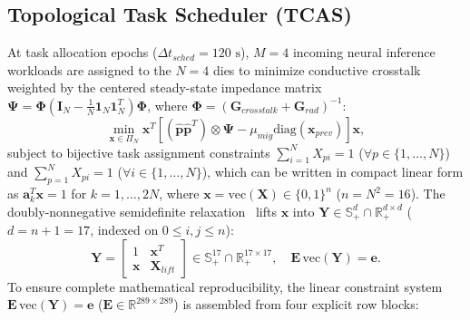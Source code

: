 \documentclass[a4paper,fleqn]{cas-dc}
\begin{document}
\subsection{Topological Task Scheduler (TCAS)}
At task allocation epochs ($\Delta t_{sched} = 120\text{ s}$), $M=4$ incoming neural inference workloads are assigned to the $N=4$ dies to minimize conductive crosstalk weighted by the centered steady-state impedance matrix $\mathbf{\Psi} = \mathbf{\Phi}(\mathbf{I}_N - \tfrac{1}{N}\mathbf{1}_N\mathbf{1}_N^T)\mathbf{\Phi}$, where $\mathbf{\Phi} = (\mathbf{G}_{crosstalk} + \mathbf{G}_{rad})^{-1}$:
\begin{equation}
\min_{\mathbf{x} \in \Pi_N} \mathbf{x}^T \left[(\hat{\mathbf{p}}\hat{\mathbf{p}}^T) \otimes \mathbf{\Psi} - \mu_{mig}\mathrm{diag}(\mathbf{x}_{prev})\right] \mathbf{x},
\end{equation}
subject to bijective task assignment constraints $\sum_{i=1}^N X_{pi} = 1$ ($\forall p \in \{1,\dots,N\}$) and $\sum_{p=1}^N X_{pi} = 1$ ($\forall i \in \{1,\dots,N\}$), which can be written in compact linear form as $\mathbf{a}_k^T \mathbf{x} = 1$ for $k = 1,\dots,2N$, where $\mathbf{x} = \mathrm{vec}(\mathbf{X}) \in \{0, 1\}^{n}$ ($n = N^2 = 16$). The doubly-nonnegative semidefinite relaxation~\citep{boyd2004convex} lifts $\mathbf{x}$ into $\mathbf{Y} \in \mathbb{S}_+^{d} \cap \mathbb{R}_+^{d \times d}$ ($d = n + 1 = 17$, indexed on $0 \le i,j \le n$):
\begin{equation}
\mathbf{Y} = \begin{bmatrix} 1 & \mathbf{x}^T \\ \mathbf{x} & \mathbf{X}_{lift} \end{bmatrix} \in \mathbb{S}_+^{17} \cap \mathbb{R}_+^{17 \times 17}, \quad \mathbf{E}\,\mathrm{vec}(\mathbf{Y}) = \mathbf{e}.
\end{equation}
To ensure complete mathematical reproducibility, the linear constraint system $\mathbf{E}\,\mathrm{vec}(\mathbf{Y}) = \mathbf{e}$ ($\mathbf{E} \in \mathbb{R}^{289\times 289}$) is assembled from four explicit row blocks:
\end{document}
